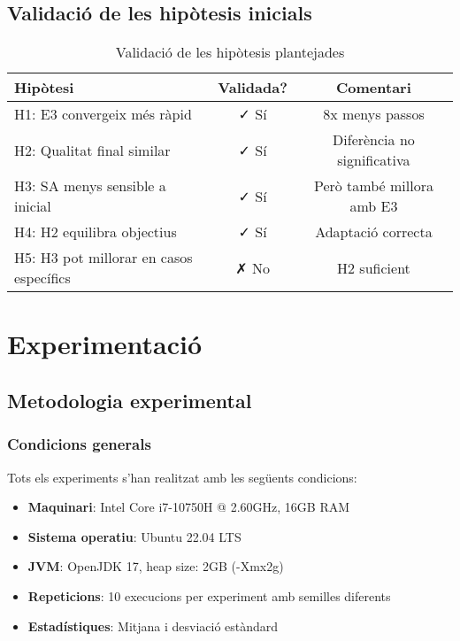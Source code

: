 \subsection{Validació de les hipòtesis inicials}

\begin{table}[H]
\centering
\begin{tabular}{@{}lcc@{}}
\toprule
\textbf{Hipòtesi} & \textbf{Validada?} & \textbf{Comentari} \\
\midrule
H1: E3 convergeix més ràpid & ✓ Sí & 8x menys passos \\
H2: Qualitat final similar & ✓ Sí & Diferència no significativa \\
H3: SA menys sensible a inicial & ✓ Sí & Però també millora amb E3 \\
H4: H2 equilibra objectius & ✓ Sí & Adaptació correcta \\
H5: H3 pot millorar en casos específics & ✗ No & H2 suficient \\
\bottomrule
\end{tabular}
\caption{Validació de les hipòtesis plantejades}
\label{tab:validacio-hipotesis}
\end{table}
\section{Experimentació}
\label{sec:experiments}

\subsection{Metodologia experimental}

\subsubsection{Condicions generals}

Tots els experiments s'han realitzat amb les següents condicions:

\begin{itemize}
    \item \textbf{Maquinari}: Intel Core i7-10750H @ 2.60GHz, 16GB RAM
    \item \textbf{Sistema operatiu}: Ubuntu 22.04 LTS
    \item \textbf{JVM}: OpenJDK 17, heap size: 2GB (-Xmx2g)
    \item \textbf{Repeticions}: 10 execucions per experiment amb semilles diferents
    \item \textbf{Estadístiques}: Mitjana i desviació estàndard
\end{itemize}

